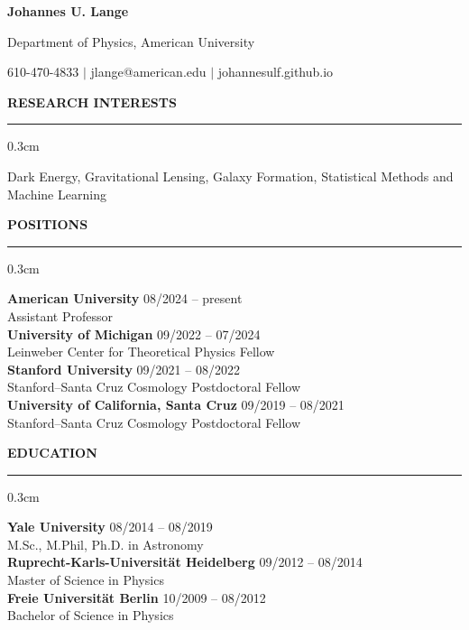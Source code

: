 \documentclass[12pt]{article}
\renewenvironment{section}[1]
  {
  \medskip
  {\color{aublue} \MakeUppercase{\bf #1}}
  \smallskip
  \hrule
  \medskip
  \begin{adjustwidth}{0.3cm}{}
  }
  {
  \end{adjustwidth}
  }
\newcommand{\entry}[3]{{\bf #1} \hfill {#2} \\ {#3}}
\begin{document}
\centerline{\color{aublue} \Huge \bf Johannes U. Lange}
\centerline{Department of Physics, American University}
\centerline{610-470-4833 $\vert$ jlange@american.edu $\vert$ johannesulf.github.io}
\bigskip

\begin{section}{Research Interests}
  Dark Energy, Gravitational Lensing, Galaxy Formation, Statistical Methods and Machine Learning
\end{section}

\begin{section}{Positions}
  \entry{American University}{08/2024 -- present}{Assistant Professor} \\
  \entry{University of Michigan}{09/2022 -- 07/2024}{Leinweber Center for Theoretical Physics Fellow} \\
  \entry{Stanford University}{09/2021 -- 08/2022}{Stanford--Santa Cruz Cosmology Postdoctoral Fellow} \\
  \entry{University of California, Santa Cruz}{09/2019 -- 08/2021}{Stanford--Santa Cruz Cosmology Postdoctoral Fellow}
\end{section}

\begin{section}{Education}
  \entry{Yale University}{08/2014 -- 08/2019}{M.Sc., M.Phil, Ph.D. in Astronomy} \\
  \entry{Ruprecht-Karls-Universität Heidelberg}{09/2012 -- 08/2014}{Master of Science in Physics} \\
  \entry{Freie Universität Berlin}{10/2009 -- 08/2012}{Bachelor of Science in Physics}
\end{section}
\end{document}
